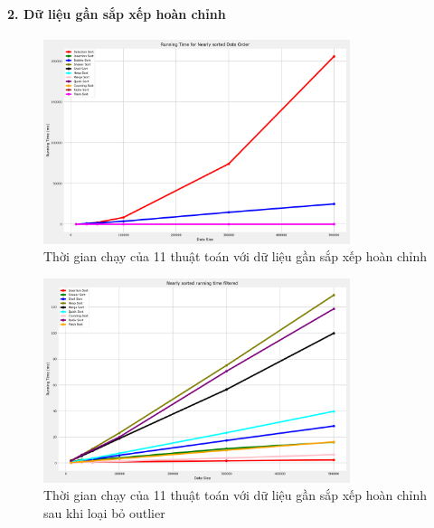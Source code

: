 \paragraph{2. Dữ liệu gần sắp xếp hoàn chỉnh}
\begin{figure}[H]
    \centering
    \includegraphics[width=0.8\textwidth]{exprimental_result/images/nearly_sorted_running_time.png}
    \caption{Thời gian chạy của 11 thuật toán với dữ liệu gần sắp xếp hoàn chỉnh}
\end{figure}

\begin{figure}[H]
    \centering
    \includegraphics[width=0.8\textwidth]{exprimental_result/images/nearly_sorted_running_time_filtered.png}
    \caption{Thời gian chạy của 11 thuật toán với dữ liệu gần sắp xếp hoàn chỉnh sau khi loại bỏ outlier}
\end{figure}


